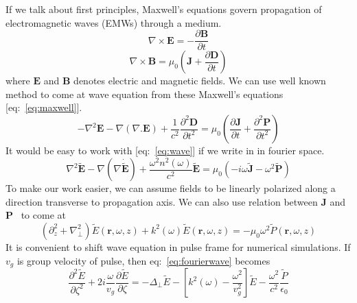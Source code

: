 \documentclass[../main.tex]{subfiles}
\begin{document}
	If we talk about first principles, Maxwell's equations govern
	propagation of electromagnetic waves (EMWs) through a medium.
	\begin{equation} \label{eq:maxwell}
		\nabla \times \textbf{E} = - \frac{\partial \textbf{B}}{\partial t}
	\end{equation}
	\begin{equation}
		\nabla \times \textbf{B} = \mu_0 \left( \textbf{J} + \frac{\partial
		\textbf{D}}{\partial t} \right)
	\end{equation}
	where $\textbf{E}$ and $\textbf{B}$ denotes electric and magnetic
	fields. We can use well known method to come at wave equation from these
	Maxwell's equations [eq:~\ref{eq:maxwell}].
	\begin{equation} \label{eq:wave}
		- \nabla^2 \textbf{E}
		- \nabla \left( \nabla . \textbf{E} \right)
		+ \frac{1}{c^2} \frac{\partial^2 \textbf{D}}{\partial t^2}
		= \mu_0 \left( \frac{\partial \textbf{J}}{\partial t} +
		\frac{\partial^2 \textbf{P}}{\partial t^2} \right)
	\end{equation}
	It would be easy to work with [eq:~\ref{eq:wave}] if we write in in
	fourier space.
	\begin{equation} \label{eq:fourierwave}
		\nabla^2 \tilde{\textbf{E}} - \nabla(\nabla \dot
		\tilde{\textbf{E}}) +
		\frac{\omega^2 n^2(\omega)}{c^2} \tilde{\textbf{E}} = \mu_0
		(-i\omega \tilde{\textbf{J}} - \omega^2 \tilde{\textbf{P}})
	\end{equation}
	To make our work easier, we can assume fields to be linearly polarized
	along a direction transverse to propagation axis. We can also use
	relation between $\textbf{J}$ and
	$\textbf{P}$~\cite{couairon_practitioners_2011,
	noauthor_nonlinear_nodate} to come at
	\begin{equation} \label{eq:polar}
		(\partial_z^2 + \nabla_\perp^2)\tilde{E}(\textbf{r}, \omega, z)
		+ k^2(\omega) \tilde{E}(\textbf{r}, \omega, z) = -\mu_0 \omega^2
		\tilde{P}(\textbf{r}, \omega, z)
	\end{equation}
	It is convenient to shift wave equation in pulse frame for numerical
	simulations. If $v_g$ is group velocity of pulse, then
	eq:~\ref{eq:fourierwave} becomes
	\begin{equation} \label{eq:pufr}
		\frac{\partial^2 \tilde{E}}{\partial \zeta^2} + 2i
		\frac{\omega}{v_g} \frac{\partial \tilde{E}}{\partial \zeta} = -
		\Delta_\perp \tilde{E} - \left[k^2(\omega) -
		\frac{\omega^2}{v_g^2} \right] \tilde{E} - \frac{\omega^2}{c^2}
		\frac{\tilde{P}}{\epsilon_0}
	\end{equation}
\end{document}
